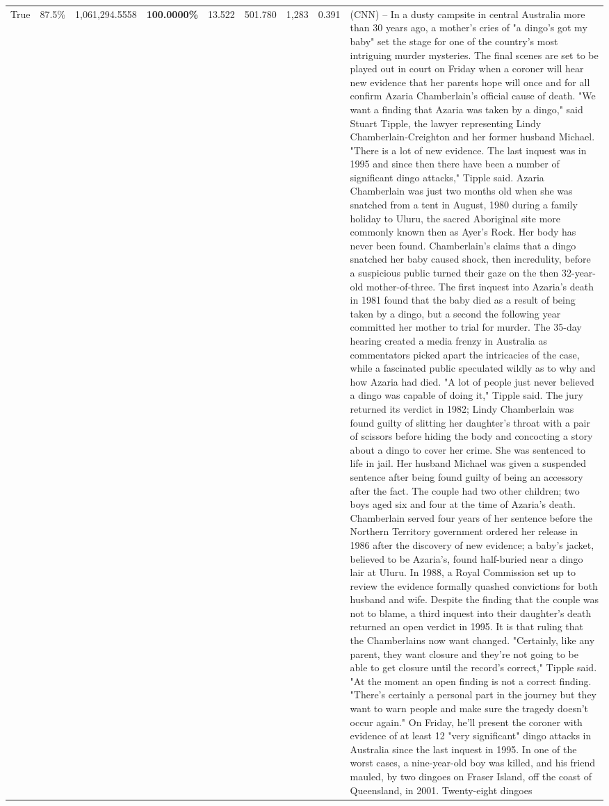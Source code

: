 \begin{table}[H]
\begin{tabular}{lllrlllll}
True & 87.5\% & 1,061,294.5558 & \bfseries \color{red} 100.0000\% & 13.522 & 501.780 & 1,283 & 0.391 & (CNN) -- In a dusty campsite in central Australia more than 30 years ago, a mother's cries of "a dingo's got my baby" set the stage for one of the country's most intriguing murder mysteries. The final scenes are set to be played out in court on Friday when a coroner will hear new evidence that her parents hope will once and for all confirm Azaria Chamberlain's official cause of death. "We want a finding that Azaria was taken by a dingo," said Stuart Tipple, the lawyer representing Lindy Chamberlain-Creighton and her former husband Michael. "There is a lot of new evidence. The last inquest was in 1995 and since then there have been a number of significant dingo attacks," Tipple said. Azaria Chamberlain was just two months old when she was snatched from a tent in August, 1980 during a family holiday to Uluru, the sacred Aboriginal site more commonly known then as Ayer's Rock. Her body has never been found. Chamberlain's claims that a dingo snatched her baby caused shock, then incredulity, before a suspicious public turned their gaze on the then 32-year-old mother-of-three. The first inquest into Azaria's death in 1981 found that the baby died as a result of being taken by a dingo, but a second the following year committed her mother to trial for murder. The 35-day hearing created a media frenzy in Australia as commentators picked apart the intricacies of the case, while a fascinated public speculated wildly as to why and how Azaria had died. "A lot of people just never believed a dingo was capable of doing it," Tipple said. The jury returned its verdict in 1982; Lindy Chamberlain was found guilty of slitting her daughter's throat with a pair of scissors before hiding the body and concocting a story about a dingo to cover her crime. She was sentenced to life in jail. Her husband Michael was given a suspended sentence after being found guilty of being an accessory after the fact. The couple had two other children; two boys aged six and four at the time of Azaria's death. Chamberlain served four years of her sentence before the Northern Territory government ordered her release in 1986 after the discovery of new evidence; a baby's jacket, believed to be Azaria's, found half-buried near a dingo lair at Uluru. In 1988, a Royal Commission set up to review the evidence formally quashed convictions for both husband and wife. Despite the finding that the couple was not to blame, a third inquest into their daughter's death returned an open verdict in 1995. It is that ruling that the Chamberlains now want changed. "Certainly, like any parent, they want closure and they're not going to be able to get closure until the record's correct," Tipple said. "At the moment an open finding is not a correct finding. "There's certainly a personal part in the journey but they want to warn people and make sure the tragedy doesn't occur again." On Friday, he'll present the coroner with evidence of at least 12 "very significant" dingo attacks in Australia since the last inquest in 1995. In one of the worst cases, a nine-year-old boy was killed, and his friend mauled, by two dingoes on Fraser Island, off the coast of Queensland, in 2001. Twenty-eight dingoes 
\end{tabular}
\end{table}
